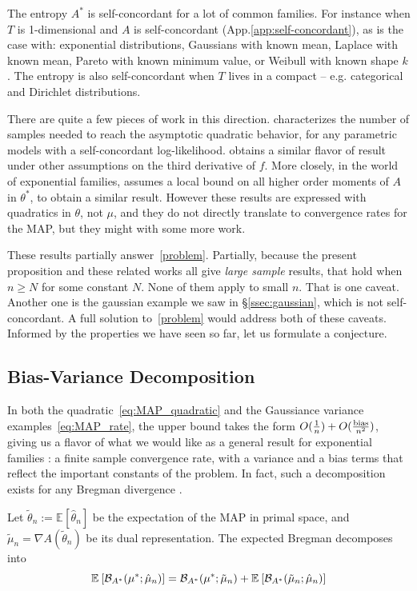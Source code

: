 \documentclass[twoside]{article}
\newcommand*{\expect}[2][]{\ensuremath{\mathbb{E}_{#1} \left[ #2 \right] }} %
\newcommand*{\expecti}[2][]{\ensuremath{\mathbb{E}_{#1} [ #2 ] }} %
\newcommand{\logpart}{A}
\newcommand{\conj}{\logpart^*}
\newcommand{\bregmanconj}{\cB_{\logpart^*}}
\newcommand{\nat}{\theta}
\newcommand{\m}{\mu}
\newcommand{\MAPm}{\hat \m_n}
\begin{document}
The entropy $\conj$ is self-concordant for a lot of common families.
For instance when $T$ is 1-dimensional and $\logpart$ is self-concordant (App.\ref{app:self-concordant}),
as is the case with:
exponential distributions,
Gaussians with known mean,
Laplace with known mean,
Pareto with known minimum value,
or Weibull with known shape $k$.
The entropy is also self-concordant when $T$ lives in a compact \citep{bubeck2015entropic} -- e.g. categorical and Dirichlet distributions.

There are quite a few pieces of work in this direction. 
\citet{ostrovskii2021finite} characterizes the number of samples needed to reach the asymptotic quadratic behavior, for any parametric models with a self-concordant log-likelihood.
\citet{anastasiou2017bounds} obtains a similar flavor of result under other assumptions on the third derivative of $f$.
More closely, in the world of exponential families, \citet{kakade2010learning} assumes a local bound on all higher order moments of $\logpart$ in $\nat^*$, to obtain a similar result.
However these results are expressed with quadratics in $\nat$, not $\m$, and they do not directly translate to convergence rates for the MAP, but they might with some more work.

These results partially answer~\eqref{problem}. 
Partially, because the present proposition and these related works all give \textit{large sample} results,  that hold when $n\geq N$ for some constant $N$.
None of them apply to small $n$.
That is one caveat. Another one is the gaussian example we saw in \S\ref{ssec:gaussian}, which is not self-concordant.
A full solution to~\eqref{problem} would address both of these caveats.
Informed by the properties we have seen so far, let us formulate a conjecture.


\subsection{Bias-Variance Decomposition}
\label{ssec:bias-variance}
In both the quadratic~\eqref{eq:MAP_quadratic} and the Gaussiance variance examples~\eqref{eq:MAP_rate}, the upper bound takes the form $O(\frac{1}{n}) + O(\frac{\text{bias}}{n^2})$, 
giving us a flavor of what we would like as a general result for exponential families : a finite sample convergence rate, with a variance and a bias terms that reflect the important constants of the problem.
In fact, such a decomposition exists for any Bregman divergence \citep[Theorem 0.1]{pfau2013generalized}.
\begin{theorem}
	Let $\tilde \theta_n := \expecti{\hat \theta_n}$ be the expectation of the MAP in primal space, and $\tilde \m_n = \nabla \logpart(\tilde \theta_n )$ be its dual representation. The  expected Bregman decomposes into
\begin{equation}
	\expect{\bregmanconj(\m^* ; \hat \m_n)} = {\bregmanconj(\m^* ; \tilde \m_n)}
	+ {\expect{\bregmanconj(\tilde \m_n ; \MAPm)}}
	\label{eq:primal_pivot}
\end{equation}
\end{theorem}
\end{document}
